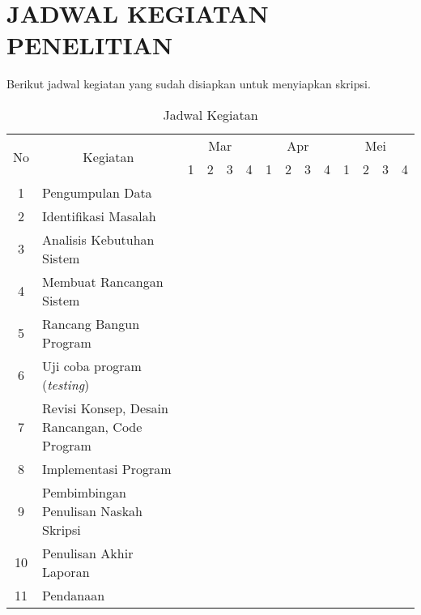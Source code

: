 \chapter*{JADWAL KEGIATAN PENELITIAN}
Berikut jadwal kegiatan yang sudah disiapkan untuk menyiapkan skripsi.


\begin{table}[!ht]
\caption{Jadwal Kegiatan}
\label{tab:jadwal-kegiatan}
\begin{tabular}{|c|m{5cm}|p{.2cm}|p{.2cm}|p{.2cm}|p{.2cm}|p{.2cm}|p{.2cm}|p{.2cm}|p{.2cm}|p{.2cm}|p{.2cm}|p{.2cm}|p{.2cm}|}
\hline
\multirow{2}{*}{No}	& 
\multicolumn{1}{c|}{\multirow{2}{*}{Kegiatan}}	& 
\multicolumn{4}{c|}{Mar} & 
\multicolumn{4}{c|}{Apr} &
\multicolumn{4}{c|}{Mei} \\ \cline{3-14}
& & 
\multicolumn{1}{c|}{1} &
\multicolumn{1}{c|}{2} &
\multicolumn{1}{c|}{3} &
\multicolumn{1}{c|}{4} &
\multicolumn{1}{c|}{1} &
\multicolumn{1}{c|}{2} &
\multicolumn{1}{c|}{3} &
\multicolumn{1}{c|}{4} &
\multicolumn{1}{c|}{1} &
\multicolumn{1}{c|}{2} &
\multicolumn{1}{c|}{3} &
\multicolumn{1}{c|}{4} \\ \hline
1  & Pengumpulan Data 			& \cellcolor{gray!75} & \cellcolor{gray!75} & & & & & & & & & & \\ \hline
2  & Identifikasi Masalah 		& & & \cellcolor{gray!75} & & & & & & & & & \\ \hline
3  & Analisis Kebutuhan Sistem 	& & \cellcolor{gray!75} & \cellcolor{gray!75} & \cellcolor{gray!75} & & & & & & & & \\ \hline
4  & Membuat Rancangan Sistem 	& & & & \cellcolor{gray!75} & \cellcolor{gray!75} & & & & & & & \\ \hline
5  & Rancang Bangun Program 	& & & & & & \cellcolor{gray!75} & \cellcolor{gray!75} & \cellcolor{gray!75} & & & & \\ \hline
6  & Uji coba program (\textit{testing}) 			& & & & & & & & \cellcolor{gray!75} & \cellcolor{gray!75} & & & \\ \hline
7  & Revisi Konsep, Desain Rancangan, Code Program & & & & & & & & & \cellcolor{gray!75} & \cellcolor{gray!75} & & \\ \hline
8  & Implementasi Program 					& & & & & & & & & & & \cellcolor{gray!75} & \\ \hline
9  & Pembimbingan Penulisan Naskah Skripsi & & & & & \cellcolor{gray!75} & \cellcolor{gray!75} & \cellcolor{gray!75} & \cellcolor{gray!75} & \cellcolor{gray!75} & & & \\ \hline
10 & Penulisan Akhir Laporan 				& & & & & & & & & & \cellcolor{gray!75} & & \\ \hline
11 & Pendanaan							& & & & & & & & & & & & \cellcolor{gray!75} \\ \hline
\end{tabular}
\end{table}

